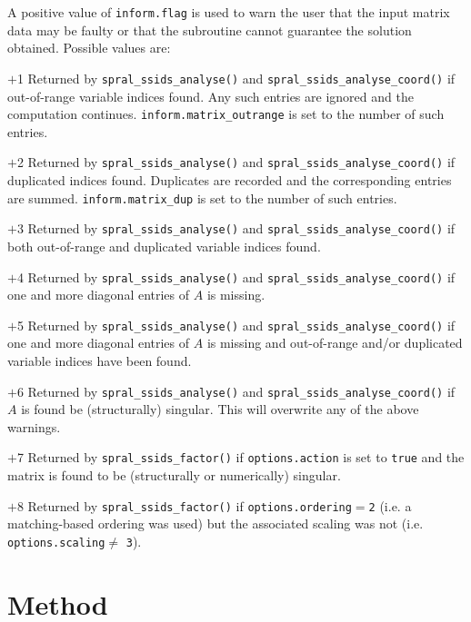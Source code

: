 A positive value of {\tt inform.flag}
is used to warn the user that the input matrix data may be faulty or that
the subroutine cannot guarantee the solution obtained.
Possible values are:
\begin{description}
\item{$+$1} Returned by {\tt spral\_ssids\_analyse()}
and {\tt spral\_ssids\_analyse\_coord()} if out-of-range variable
indices found.
Any such entries are ignored  and the computation continues.
{\tt inform.matrix\_outrange} is set to the number of such entries.

\item{$+$2} Returned by {\tt spral\_ssids\_analyse()} and {\tt spral\_ssids\_analyse\_coord()}
if duplicated indices found. Duplicates are recorded and the corresponding
entries are summed. {\tt inform.matrix\_dup} is set to the number of such entries.

\item{$+$3} Returned by {\tt spral\_ssids\_analyse()} and {\tt spral\_ssids\_analyse\_coord()} if both
out-of-range and duplicated variable indices found.

\item{$+$4} Returned by {\tt spral\_ssids\_analyse()}  and {\tt spral\_ssids\_analyse\_coord()}
if  one and more diagonal entries
of $A$ is missing.

\item{$+$5} Returned by {\tt spral\_ssids\_analyse()}  and {\tt spral\_ssids\_analyse\_coord()}
if  one and more diagonal entries
of $A$ is missing  and
out-of-range and/or duplicated variable indices have been found.

\item{$+$6} Returned by {\tt spral\_ssids\_analyse()}  and {\tt spral\_ssids\_analyse\_coord()} if
$A$ is found be (structurally) singular. This will overwrite any of the above warnings.

\item{$+$7} Returned by {\tt spral\_ssids\_factor()} if {\tt options.action} is set
to {\tt true} and the matrix is found to be (structurally or numerically)
singular.

\item{$+$8} Returned by {\tt spral\_ssids\_factor()} if
{\tt options.ordering}$=${\tt 2} (i.e.
a matching-based ordering was used) but the associated scaling was not (i.e. {\tt options.scaling}$\ne$
{\tt 3}).

\end{description}

\section{Method} \label{ssids: method}

